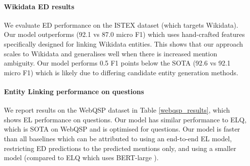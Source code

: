 \documentclass[11pt]{article}
\begin{document}
\paragraph{Wikidata ED results}
We evaluate ED performance on the ISTEX dataset (which targets Wikidata). Our model outperforms \citet{delpeuch2020opentapioca} (92.1 vs 87.0 micro F1) which uses hand-crafted features specifically designed for linking Wikidata entities. This shows that our approach scales to Wikidata and generalises well when there is increased mention ambiguity. Our model performs 0.5 F1 points below the SOTA \citet{Mulang__2020} (92.6 vs 92.1 micro F1) which is likely due to differing candidate entity generation methods.





\paragraph{Entity Linking performance on questions}
We report results on the WebQSP dataset in Table \ref{webqsp_results}, which shows EL performance on questions. Our model has similar performance to ELQ, which is SOTA on WebQSP and is optimised for questions. Our model is faster than all baselines which can be attributed to using an end-to-end EL model, restricting ED predictions to the predicted mentions only, and using a smaller model (compared to ELQ which uses BERT-large \citep{devlin-etal-2019-bert}). 

\begin{table}[H]

\centering
{}
\caption{Entity linking weak matching InKB micro F1 scores on WebQSP EL dataset \citep{li-etal-2020-efficient}. \#Q/s is number of questions per second for a single CPU.}
\label{webqsp_results}
\end{table}
\end{document}

